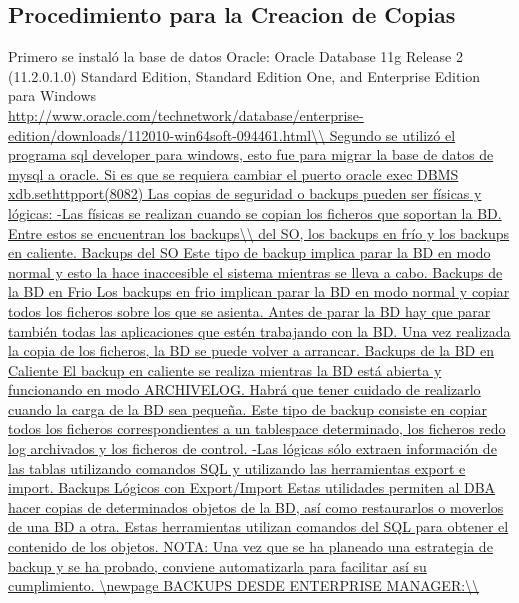 \documentclass[12pt,letterpaper]{article}
\begin{document}
\subsection{Procedimiento para la Creacion de Copias}
Primero se instaló la base de datos Oracle:
Oracle Database 11g Release 2 (11.2.0.1.0)
Standard Edition, Standard Edition One, and Enterprise Edition para Windows\\
\url{http://www.oracle.com/technetwork/database/enterprise-edition/downloads/112010-win64soft-094461.html\\

Segundo se utilizó el programa sql developer para windows, esto fue para migrar la base de datos de mysql a oracle.
Si es que se requiera cambiar el puerto  oracle exec DBMS xdb.sethttpport(8082)

Las copias de seguridad o backups pueden ser físicas y lógicas:
-Las físicas se realizan cuando se copian los ficheros que soportan la BD. Entre estos se encuentran los backups\\
del SO, los backups en frío y los backups en caliente.

Backups del SO
Este tipo de backup implica parar la BD en modo normal y esto la hace inaccesible el sistema mientras se lleva a cabo.

Backups de la BD en Frio
Los backups en frio implican parar la BD en modo normal y copiar todos los ficheros sobre los que se asienta. Antes de parar la BD hay que parar también todas las aplicaciones que estén trabajando con la BD. Una vez realizada la copia de los ficheros, la BD se puede volver a arrancar.

Backups de la BD en Caliente
El backup en caliente se realiza mientras la BD está abierta y funcionando en modo ARCHIVELOG. Habrá que tener cuidado de realizarlo cuando la carga de la BD sea pequeña. Este tipo de backup consiste en copiar todos los ficheros correspondientes a un tablespace determinado, los ficheros redo log archivados y los ficheros de control.


-Las lógicas sólo extraen información de las tablas utilizando comandos SQL y utilizando las herramientas export e import.

Backups Lógicos con Export/Import

Estas utilidades permiten al DBA hacer copias de determinados objetos de la BD, así como restaurarlos o moverlos de una BD a otra. Estas herramientas utilizan comandos del SQL para obtener el contenido de los objetos.

NOTA: Una vez que se ha planeado una estrategia de backup y se ha probado, conviene automatizarla para facilitar así su cumplimiento.
\newpage
BACKUPS  DESDE  ENTERPRISE  MANAGER:\\

}
\end{document}
